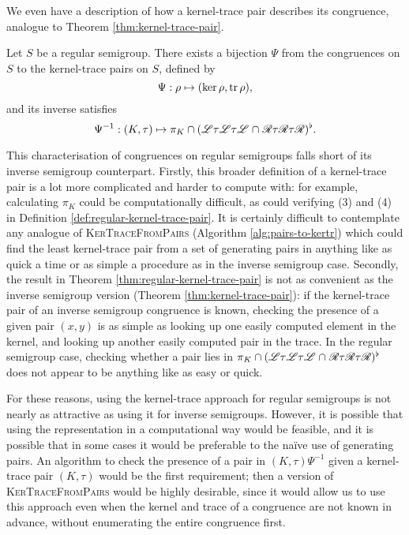 We even have a description of how a kernel-trace pair describes its congruence,
analogue to Theorem \ref{thm:kernel-trace-pair}.

\begin{theorem}
  \label{thm:regular-kernel-trace-pair}
  Let $S$ be a regular semigroup.  There exists a bijection $\Psi$ from the
  congruences on $S$ to the kernel-trace pairs on $S$, defined by
  $$\Psi: \rho \mapsto (\ker\rho, \operatorname{tr}\rho),$$
  and its inverse satisfies
  $$\Psi^{-1} : (K,\tau) \mapsto \pi_K \cap
  (\mathrel{\mathscr{L}}\mathrel{\tau}\mathrel{\mathscr{L}}\mathrel{\tau}\mathrel{\mathscr{L}} \cap
  \mathrel{\mathscr{R}}\mathrel{\tau}\mathrel{\mathscr{R}}\mathrel{\tau}\mathrel{\mathscr{R}})^\flat.$$
\end{theorem}

This characterisation of congruences on regular semigroups falls short of its
inverse semigroup counterpart.  Firstly, this broader definition of a
kernel-trace pair is a lot more complicated and harder to compute with: for
example, calculating $\pi_K$ could be computationally difficult, as could
verifying (3) and (4) in Definition \ref{def:regular-kernel-trace-pair}.  It is
certainly difficult to contemplate any analogue of \textsc{KerTraceFromPairs}
(Algorithm \ref{alg:pairs-to-kertr}) which could find the least kernel-trace
pair from a set of generating pairs in anything like as quick a time or as
simple a procedure as in the inverse semigroup case.  Secondly, the result in
Theorem \ref{thm:regular-kernel-trace-pair} is not as convenient as the inverse
semigroup version (Theorem \ref{thm:kernel-trace-pair}): if the kernel-trace
pair of an inverse semigroup congruence is known, checking the presence of a
given pair $(x,y)$ is as simple as looking up one easily computed element in the
kernel, and looking up another easily computed pair in the trace.  In the
regular semigroup case, checking whether a pair lies in
$\pi_K \cap (\mathrel{\mathscr{L}}\mathrel{\tau}\mathrel{\mathscr{L}}\mathrel{\tau}\mathrel{\mathscr{L}} \cap
\mathrel{\mathscr{R}}\mathrel{\tau}\mathrel{\mathscr{R}}\mathrel{\tau}\mathrel{\mathscr{R}})^\flat$ does not appear to be anything
like as easy or quick.

For these reasons, using the kernel-trace approach for regular semigroups is not
nearly as attractive as using it for inverse semigroups.  However, it is
possible that using the representation in a computational way would be feasible,
and it is possible that in some cases it would be preferable to the na\"{i}ve
use of generating pairs.  An algorithm to check the presence of a pair in
$(K,\tau)\Psi^{-1}$ given a kernel-trace pair $(K,\tau)$ would be the first
requirement; then a version of \textsc{KerTraceFromPairs} would be highly
desirable, since it would allow us to use this approach even when the kernel and
trace of a congruence are not known in advance, without enumerating the entire
congruence first.
